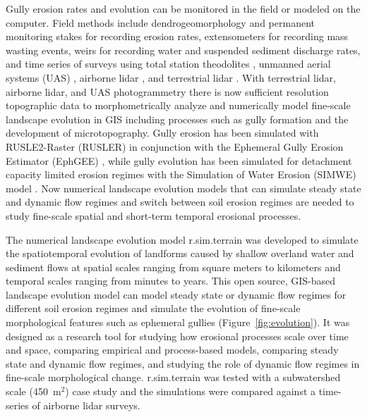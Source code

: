 \documentclass[gmd, manuscript]{copernicus}
\begin{document}
Gully erosion rates and evolution
can be monitored in the field 
or modeled on the computer. 
Field methods include
dendrogeomorphology \citep{Malik2008} and 
permanent monitoring stakes for recording erosion rates, 
extensometers for recording mass wasting events, 
weirs for recording water and suspended sediment discharge rates, 
and time series of surveys using 
total station theodolites \citep{Thomas2004},
unmanned aerial systems (UAS) \citep{Jeziorska2016,Kasprak2019,Yang2019},
airborne lidar \citep{Perroy2010,Starek2011}, 
and terrestrial lidar \citep{Starek2011,Bechet2016,Goodwin2016,Telling2017}.
With terrestrial lidar, airborne lidar, and 
UAS photogrammetry
there is now sufficient resolution topographic data 
to morphometrically analyze and 
numerically model fine-scale landscape evolution in GIS
including processes such as gully formation 
and the development of microtopography. 
Gully erosion has been simulated with 
RUSLE2-Raster (RUSLER)
in conjunction with the Ephemeral Gully Erosion Estimator (EphGEE)
\citep{Dabney2014},
while gully evolution
has been simulated for detachment capacity limited erosion regimes
with the Simulation of Water Erosion (SIMWE) model
\citep{Koco2011, Mitasova2013}. 
Now numerical landscape evolution models 
that can simulate 
steady state and dynamic flow regimes
and switch between soil erosion regimes 
are needed to study 
fine-scale spatial and short-term temporal erosional processes.

The numerical landscape evolution model 
r.sim.terrain was developed to 
simulate the spatiotemporal evolution of landforms
caused by shallow overland water and sediment flows
at spatial scales ranging from
square meters to kilometers
and temporal scales ranging from minutes to years. 
This open source, GIS-based landscape evolution model can
model steady state or dynamic flow regimes
for different soil erosion regimes and
simulate the evolution of fine-scale morphological features 
such as ephemeral gullies
(Figure~\ref{fig:evolution}).
It was designed as a research tool for
studying how erosional processes scale over time and space,
comparing empirical and process-based models, 
comparing steady state and dynamic flow regimes, and
studying the role of dynamic flow regimes 
in fine-scale morphological change. 
r.sim.terrain was tested with 
a subwatershed scale (450~\unit{m}$^{2}$) case study
and the simulations were compared against 
a time-series of airborne lidar surveys.
\end{document}
